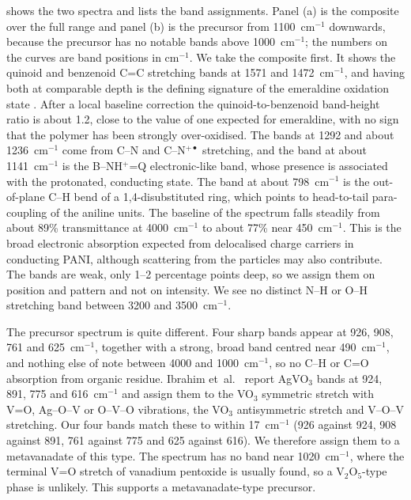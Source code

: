 \documentclass[preprint,11pt]{elsarticle}
\begin{document}
 shows the two spectra and  lists the band assignments. Panel (a) is the composite over the full range and panel (b) is the precursor from 1100~cm$^{-1}$ downwards, because the precursor has no notable bands above 1000~cm$^{-1}$; the numbers on the curves are band positions in cm$^{-1}$. We take the composite first. It shows the quinoid and benzenoid C=C stretching bands at 1571 and 1472~cm$^{-1}$, and having both at comparable depth is the defining signature of the emeraldine oxidation state \cite{yang2023panisensors,golba2019paniftir}. After a local baseline correction the quinoid-to-benzenoid band-height ratio is about 1.2, close to the value of one expected for emeraldine, with no sign that the polymer has been strongly over-oxidised. The bands at 1292 and about 1236~cm$^{-1}$ come from C--N and C--N$^{+\bullet}$ stretching, and the band at about 1141~cm$^{-1}$ is the B--NH$^{+}$=Q electronic-like band, whose presence is associated with the protonated, conducting state. The band at about 798~cm$^{-1}$ is the out-of-plane C--H bend of a 1,4-disubstituted ring, which points to head-to-tail para-coupling of the aniline units. The baseline of the spectrum falls steadily from about 89\% transmittance at 4000~cm$^{-1}$ to about 77\% near 450~cm$^{-1}$. This is the broad electronic absorption expected from delocalised charge carriers in conducting PANI, although scattering from the particles may also contribute. The bands are weak, only 1--2 percentage points deep, so we assign them on position and pattern and not on intensity. We see no distinct N--H or O--H stretching band between 3200 and 3500~cm$^{-1}$.



The precursor spectrum is quite different. Four sharp bands appear at 926, 908, 761 and 625~cm$^{-1}$, together with a strong, broad band centred near 490~cm$^{-1}$, and nothing else of note between 4000 and 1000~cm$^{-1}$, so no C--H or C=O absorption from organic residue. Ibrahim et~al.\ \cite{ibrahim2024chitosanagvo3} report AgVO$_3$ bands at 924, 891, 775 and 616~cm$^{-1}$ and assign them to the VO$_3$ symmetric stretch with V=O, Ag--O--V or O--V--O vibrations, the VO$_3$ antisymmetric stretch and V--O--V stretching. Our four bands match these to within 17~cm$^{-1}$ (926 against 924, 908 against 891, 761 against 775 and 625 against 616). We therefore assign them to a metavanadate of this type. The spectrum has no band near 1020~cm$^{-1}$, where the terminal V=O stretch of vanadium pentoxide is usually found, so a V$_2$O$_5$-type phase is unlikely. This supports a metavanadate-type precursor.
\end{document}

